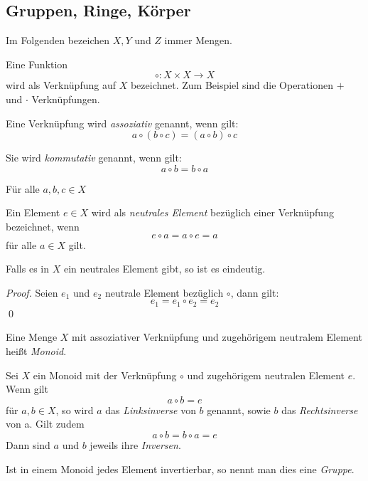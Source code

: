 \subsection{Gruppen, Ringe, Körper}
Im Folgenden bezeichen $X,Y$ und $Z$ immer Mengen.

\begin{definition}
Eine Funktion
\[ \circ : X \times X \longrightarrow X \]
wird als Verknüpfung auf $X$ bezeichnet. Zum Beispiel sind die Operationen $+$ und $\cdot$ Verknüpfungen. 
\end{definition}

\begin{definition}
Eine Verknüpfung wird \textsl{assoziativ} genannt, wenn gilt:
\[ a \circ (b \circ c) = (a \circ b) \circ c \]
\end{definition}
\begin{definition}
Sie wird \textsl{kommutativ} genannt, wenn gilt: 
\[ a \circ b = b \circ a \]
\end{definition}
Für alle $a,b,c \in X$

\begin{definition}
Ein Element $e\in X$ wird als \textsl{neutrales Element} bezüglich einer Verknüpfung bezeichnet, wenn 
\[ e\circ a = a \circ e = a \]
für alle $a\in X$ gilt.
\end{definition}

\begin{claim}
Falls es in $X$ ein neutrales Element gibt, so ist es eindeutig. 
\end{claim}
\begin{proof}
\smartqed
Seien $e_1$ und $e_2$ neutrale Element bezüglich $\circ$, dann gilt: 
\[ e_1 = e_1\circ e_2 = e_2 \] \qed
\end{proof}

\begin{definition}
Eine Menge $X$ mit assoziativer Verknüpfung und zugehörigem neutralem Element heißt \textsl{Monoid}.
\end{definition}

\begin{definition}
Sei $X$ ein Monoid mit der Verknüpfung $\circ$ und zugehörigem neutralen Element $e$. Wenn gilt
\[ a\circ b = e \]
für $a,b \in X$, so wird $a$ das \textsl{Linksinverse} von $b$ genannt, sowie $b$ das \textsl{Rechtsinverse} von a. Gilt zudem
\[ a\circ b = b \circ a = e \]
Dann sind $a$ und $b$ jeweils ihre \textsl{Inversen}.
\end{definition}

\begin{definition}
Ist in einem Monoid jedes Element invertierbar, so nennt man dies eine \textsl{Gruppe}.
\end{definition}

